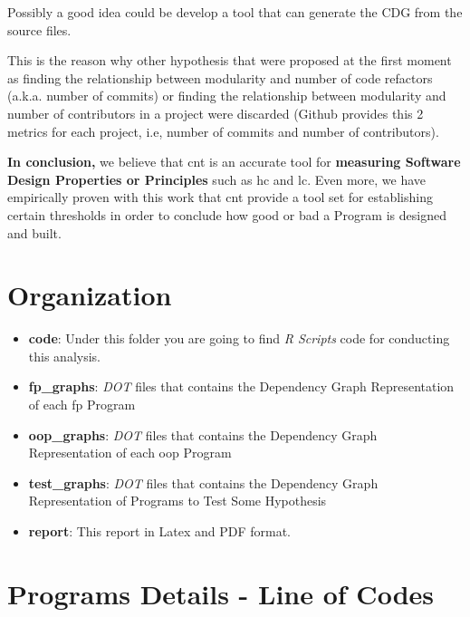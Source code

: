 \documentclass[12pt, a4paper]{article}
\begin{document}
Possibly a good idea could be develop a tool that can generate the CDG from the source files.

This is the reason why other hypothesis that were proposed at the first moment as finding the relationship between modularity and number of code refactors (a.k.a. number of commits) or finding the relationship between modularity and number of contributors in a project were discarded (Github provides this 2 metrics for each project, i.e, number of commits and number of contributors).

\textbf{In conclusion,} we believe that \acrfull{cnt} is an accurate tool for \textbf{measuring Software Design Properties or Principles} such as \acrlong{hc} and \acrlong{lc}. 
Even more, we have empirically proven with this work that \acrlong{cnt} provide a tool set for establishing certain thresholds in order to conclude how good or bad a Program is designed and built. 




\appendix
\section{Organization}\label{apx:sec:org:1}

\begin{itemize}
    \item \textbf{code}: Under this folder you are going to find \textit{R Scripts} code for conducting this analysis.
    \item \textbf{fp\_graphs}: \textit{DOT} files that contains the Dependency Graph Representation of each \acrlong{fp} Program
    \item \textbf{oop\_graphs}: \textit{DOT} files that contains the Dependency Graph Representation of each \acrlong{oop} Program
    \item \textbf{test\_graphs}: \textit{DOT} files that contains the Dependency Graph Representation of Programs to Test Some Hypothesis
    \item \textbf{report}: This report in Latex and PDF format.
\end{itemize}

\section{Programs Details - Line of Codes}\label{apx:sec:loc}
\end{document}
